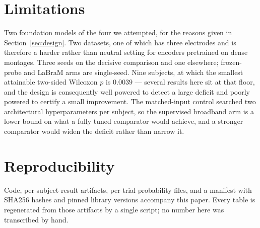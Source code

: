 \section{Limitations}

Two foundation models of the four we attempted, for the reasons given in
Section~\ref{sec:design}. Two datasets, one of which has three electrodes and
is therefore a harder rather than neutral setting for encoders pretrained on
dense montages. Three seeds on the decisive comparison and one elsewhere;
frozen-probe and LaBraM arms are single-seed. Nine subjects, at which the
smallest attainable two-sided Wilcoxon $p$ is $0.0039$ --- several results here
sit at that floor, and the design is consequently well powered to detect a
large deficit and poorly powered to certify a small improvement. The
matched-input control searched two architectural hyperparameters per subject,
so the supervised broadband arm is a lower bound on what a fully tuned
comparator would achieve, and a stronger comparator would widen the deficit
rather than narrow it.

\section*{Reproducibility}
Code, per-subject result artifacts, per-trial probability files, and a
manifest with SHA256 hashes and pinned library versions accompany this paper.
Every table is regenerated from those artifacts by a single script; no number
here was transcribed by hand.
